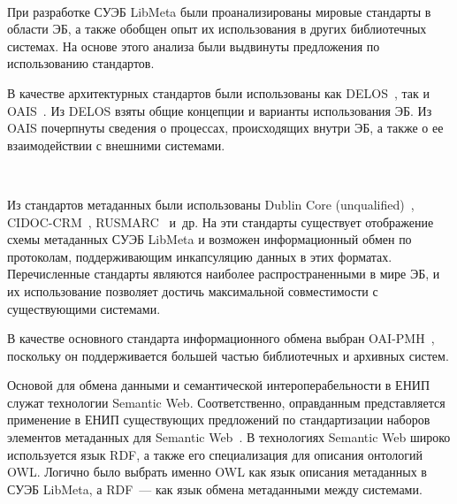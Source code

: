 \begin{multicols}{2}
  \begin{figure*}[b] %
  \vspace*{9pt}
\begin{center}
\mbox{%
\epsfxsize=100mm
}
\end{center}
\vspace*{-6pt}
  \end{figure*}
  
  При разработке СУЭБ LibMeta были проанализированы мировые стандарты в области ЭБ, 
а также обобщен опыт их использования в других библиотечных системах. На основе этого 
анализа были выдвинуты предложения по использованию стандартов.
  
  В качестве архитектурных стандартов были использованы как DELOS~\cite{15ser}, так и 
OAIS~\cite{14ser}. Из DELOS взяты общие концепции и варианты использования ЭБ. Из 
OAIS почерпнуты сведения о процессах, происходящих внутри ЭБ, а также о ее 
взаимодействии с внешними системами.

  \begin{figure*}[b] %
  \vspace*{6pt}
\begin{center}
\mbox{%
\epsfxsize=92.219mm
}
\end{center}
\vspace*{-6pt}
  \end{figure*}
  
  Из стандартов метаданных были использованы Dublin Core (unqualified)~\cite{11ser}, 
CIDOC-CRM~\cite{16ser}, RUSMARC~\cite{20ser} и~др. На эти стандарты существует 
отображение схемы метаданных СУЭБ LibMeta и возможен информационный обмен по 
протоколам, поддерживающим инкапсуляцию данных в этих форматах. Перечисленные 
стандарты являются наиболее распространенными в мире ЭБ, и их использование позволяет 
достичь максимальной совместимости с существующими системами.
  
  В качестве основного стандарта информационного обмена выбран OAI-PMH~\cite{22ser}, 
поскольку он поддерживается большей частью библиотечных и архивных систем.
  
  Основой для обмена данными и семантической интероперабельности в ЕНИП служат 
технологии Semantic Web. Соответственно, оправданным представляется применение в 
ЕНИП существующих предложений по стандартизации наборов элементов метаданных для 
Semantic Web~\cite{2ser, 3ser, 8ser}. В технологиях Semantic Web широко используется язык 
RDF, а также его специализация для описания онтологий OWL. Логично было выбрать 
именно OWL как язык описания метаданных в СУЭБ LibMeta, а RDF~--- как язык обмена 
метаданными между системами.
  

\end{multicols}
